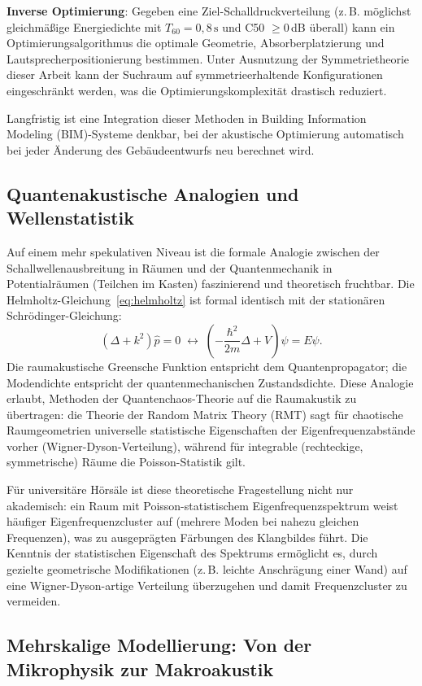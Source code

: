 ﻿\documentclass[12pt, a4paper]{article}
\theoremstyle{definition}
\theoremstyle{remark}
\begin{document}
\textbf{Inverse Optimierung}: Gegeben eine Ziel-Schalldruckverteilung
(z.\,B. möglichst gleichmäßige Energiedichte mit $T_{60} = 0{,}8\,\mathrm{s}$
und C50 $\geq 0$\,dB überall) kann ein Optimierungsalgorithmus
die optimale Geometrie, Absorberplatzierung und Lautsprecherpositionierung
bestimmen. Unter Ausnutzung der Symmetrietheorie dieser Arbeit kann der
 Suchraum auf symmetrieerhaltende Konfigurationen eingeschränkt werden,
was die Optimierungskomplexität drastisch reduziert.

Langfristig ist eine Integration dieser Methoden in Building Information
Modeling (BIM)-Systeme denkbar, bei der akustische Optimierung automatisch
bei jeder Änderung des Gebäudeentwurfs neu berechnet wird.

\subsection{Quantenakustische Analogien und Wellenstatistik}

Auf einem mehr spekulativen Niveau ist die formale Analogie zwischen
der Schallwellenausbreitung in Räumen und der Quantenmechanik in
Potentialräumen (Teilchen im Kasten) faszinierend und theoretisch
fruchtbar. Die Helmholtz-Gleichung~\eqref{eq:helmholtz} ist formal
identisch mit der stationären Schrödinger-Gleichung:
\[
  (\Delta + k^2)\hat{p} = 0 \;\longleftrightarrow\;
  \left(-\frac{\hbar^2}{2m}\Delta + V\right)\psi = E\psi.
\]
Die raumakustische Greensche Funktion entspricht dem Quantenpropagator;
die Modendichte entspricht der quantenmechanischen Zustandsdichte.
Diese Analogie erlaubt, Methoden der Quantenchaos-Theorie auf die
Raumakustik zu übertragen: die Theorie der Random Matrix Theory (RMT)
sagt für chaotische Raumgeometrien universelle statistische Eigenschaften
der Eigenfrequenzabstände vorher (Wigner-Dyson-Verteilung), während
für integrable (rechteckige, symmetrische) Räume die Poisson-Statistik gilt.

Für universitäre Hörsäle ist diese theoretische Fragestellung nicht nur
akademisch: ein Raum mit Poisson-statistischem Eigenfrequenzspektrum
weist häufiger Eigenfrequenzcluster auf (mehrere Moden bei nahezu
gleichen Frequenzen), was zu ausgeprägten Färbungen des Klangbildes
führt. Die Kenntnis der statistischen Eigenschaft des Spektrums ermöglicht
es, durch gezielte geometrische Modifikationen (z.\,B. leichte Anschrägung
einer Wand) auf eine Wigner-Dyson-artige Verteilung überzugehen und
damit Frequenzcluster zu vermeiden.

\subsection{Mehrskalige Modellierung: Von der Mikrophysik zur Makroakustik}
\end{document}

